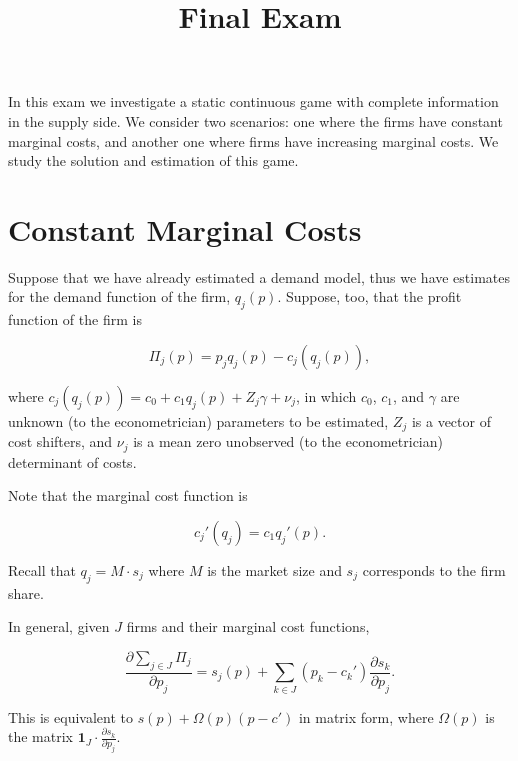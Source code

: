 \documentclass[cm,linguex]{glossa}
\title[Empirical Industrial Organization]{Final Exam}
\author[Carlos Lezama]{
    \spauthor{Carlos Lezama\\
  \institute{\hfill\break
Instituto Tecnológico\\
Autónomo de México}\\
  \small{\hfill\break
clezamaj@itam.mx}
  }%
  }
\theoremstyle{defn}
\theoremstyle{axiom}
\theoremstyle{thm}
\theoremstyle{lem}
\theoremstyle{cor}
\theoremstyle{prop}
\theoremstyle{rmk}
\begin{document}
\sffamily
\maketitle



\rmfamily

\maketitle
\thispagestyle{empty}

In this exam we investigate a static continuous game with complete
information in the supply side. We consider two scenarios: one where the
firms have constant marginal costs, and another one where firms have
increasing marginal costs. We study the solution and estimation of this
game.

\hypertarget{constant-marginal-costs}{%
\section{Constant Marginal Costs}\label{constant-marginal-costs}}

Suppose that we have already estimated a demand model, thus we have
estimates for the demand function of the firm, \(q_j(p)\). Suppose, too,
that the profit function of the firm is

\[ \Pi_j(p) = p_jq_j(p) - c_j\left(q_j(p)\right) , \]

where \(c_j\left(q_j(p)\right) = c_0 + c_1q_j(p) + Z_j\gamma + \nu_j\),
in which \(c_0\), \(c_1\), and \(\gamma\) are unknown (to the
econometrician) parameters to be estimated, \(Z_j\) is a vector of cost
shifters, and \(\nu_j\) is a mean zero unobserved (to the
econometrician) determinant of costs.

Note that the marginal cost function is

\[ c_j'(q_j) = c_1 q_j'(p). \]

Recall that \(q_j = M \cdot s_j\) where \(M\) is the market size and
\(s_j\) corresponds to the firm share.

In general, given \(J\) firms and their marginal cost functions,

\[ \frac{\partial \sum_{j \in J} \Pi_j}{\partial p_j} = s_j(p) + \sum_{k \in J} (p_k - c_k') \frac{\partial s_k}{\partial p_j}. \]

This is equivalent to \(s(p) + \Omega(p) (p - c')\) in matrix form,
where \(\Omega(p)\) is the matrix
\(\mathbf{1}_J \cdot \frac{\partial s_k}{\partial p_j}\).
\end{document}
